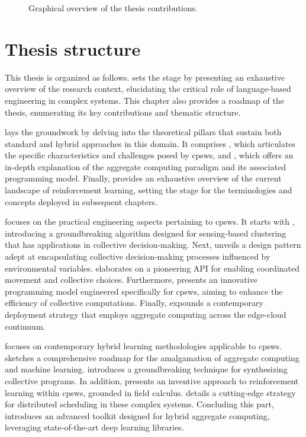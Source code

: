 \begin{refsection}
\begin{figure}
    \caption{Graphical overview of the thesis contributions.}\label{fig:contributions}
\end{figure}
\section{Thesis structure}
This thesis is organized as follows.
 sets the stage by presenting an exhaustive overview of the research context, 
 elucidating the critical role of language-based engineering in complex systems. 
 This chapter also provides a roadmap of the thesis, enumerating its key contributions and thematic structure.

 lays the groundwork by delving into the theoretical pillars that sustain both standard and hybrid approaches in this domain. 
 It comprises , which articulates the specific characteristics and challenges posed by \acp{cpsw}, and , 
 which offers an in-depth explanation of the aggregate computing paradigm and its associated programming model.
 Finally,  provides an exhaustive overview of the current landscape of reinforcement learning, 
 setting the stage for the terminologies and concepts deployed in subsequent chapters. 

 focuses on the practical engineering aspects pertaining to \acp{cpsw}. 
 It starts with , introducing a groundbreaking algorithm designed for sensing-based clustering that has applications in collective decision-making. 
 Next,  unveils a design pattern adept at encapsulating collective decision-making processes influenced by environmental variables. 
  elaborates on a pioneering API for enabling coordinated movement and collective choices.
 Furthermore,  presents an innovative programming model engineered specifically for \acp{cpsw}, aiming to enhance the efficiency of collective computations. 
 Finally,  expounds a contemporary deployment strategy that employs aggregate computing across the edge-cloud continuum.

 focuses on contemporary hybrid learning methodologies applicable to \acp{cpsw}.  
  sketches a comprehensive roadmap for the amalgamation of aggregate computing and machine learning. 
  introduces a groundbreaking technique for synthesizing collective programs. 
 In addition,  presents an inventive approach to reinforcement learning within \acp{cpsw}, grounded in field calculus. 
  details a cutting-edge strategy for distributed scheduling in these complex systems. 
 Concluding this part,  introduces an advanced toolkit designed for hybrid aggregate computing, 
 leveraging state-of-the-art deep learning libraries.


\end{refsection}

